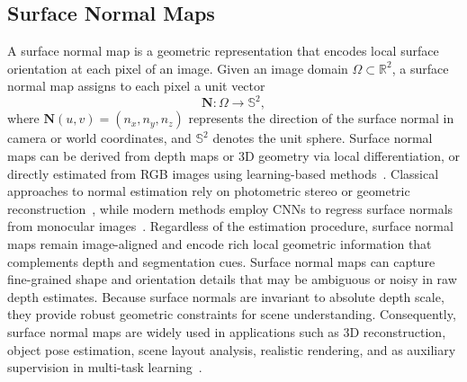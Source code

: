 \subsection{Surface Normal Maps}
\label{subsec:p-2-sec-4-2D-surface-normal-maps}
A surface normal map is a geometric representation that encodes local surface orientation at each pixel of an image. Given an image domain
$\Omega \subset \mathbb{R}^2$, a surface normal map assigns to each pixel a unit vector
\begin{equation}
\mathbf{N}: \Omega \rightarrow \mathbb{S}^2,
\end{equation}
where $\mathbf{N}(u,v) = (n_x, n_y, n_z)$ represents the direction of the surface normal in camera or world coordinates, and $\mathbb{S}^2$ denotes the unit sphere. Surface normal maps can be derived from depth maps or 3D geometry via local differentiation, or directly estimated from RGB images using learning-based methods~\cite{barron2015shape}.
Classical approaches to normal estimation rely on photometric stereo or geometric reconstruction~\cite{woodham1980photometric}, while modern methods employ CNNs to regress surface normals from monocular images~\cite{eigen2015predicting}. 
Regardless of the estimation procedure, surface normal maps remain image-aligned and
encode rich local geometric information that complements depth and segmentation cues.
Surface normal maps can capture fine-grained shape and orientation details that may be ambiguous or noisy in raw depth estimates.
Because surface normals are invariant to absolute depth scale, they provide robust geometric constraints for scene understanding. 
Consequently, surface normal maps are widely used in applications such as 3D reconstruction, object pose estimation, scene layout analysis, realistic rendering, and as auxiliary supervision in multi-task learning~\cite{eigen2015predicting}.



